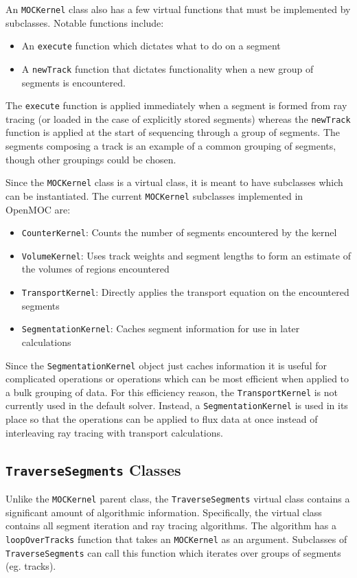 An \texttt{MOCKernel} class also has a few virtual functions that must be implemented by subclasses. Notable functions include:
\begin{itemize}
	\item An \texttt{execute} function which dictates what to do on a segment
	\item A \texttt{newTrack} function that dictates functionality when a new group of segments is encountered.
\end{itemize}
The \texttt{execute} function is applied immediately when a segment is formed from ray tracing (or loaded in the case of explicitly stored segments) whereas the \texttt{newTrack} function is applied at the start of sequencing through a group of segments. The segments composing a track is an example of a common grouping of segments, though other groupings could be chosen.

Since the \texttt{MOCKernel} class is a virtual class, it is meant to have subclasses which can be instantiated. The current \texttt{MOCKernel} subclasses implemented in OpenMOC are:
\begin{itemize}
	\item \texttt{CounterKernel}: Counts the number of segments encountered by the kernel
	\item \texttt{VolumeKernel}: Uses track weights and segment lengths to form an estimate of the volumes of regions encountered
	\item \texttt{TransportKernel}: Directly applies the transport equation on the encountered segments
	\item \texttt{SegmentationKernel}: Caches segment information for use in later calculations
\end{itemize}
Since the \texttt{SegmentationKernel} object just caches information it is useful for complicated operations or operations which can be most efficient when applied to a bulk grouping of data. For this efficiency reason, the \texttt{TransportKernel} is not currently used in the default solver. Instead, a \texttt{SegmentationKernel} is used in its place so that the operations can be applied to flux data at once instead of interleaving ray tracing with transport calculations.

\subsection{\texttt{TraverseSegments} Classes}

Unlike the \texttt{MOCKernel} parent class, the \texttt{TraverseSegments} virtual class contains a significant amount of algorithmic information. Specifically, the virtual class contains all segment iteration and ray tracing algorithms. The algorithm has a \texttt{loopOverTracks} function that takes an \texttt{MOCKernel} as an argument. Subclasses of \texttt{TraverseSegments} can call this function which iterates over groups of segments (eg. tracks). 

